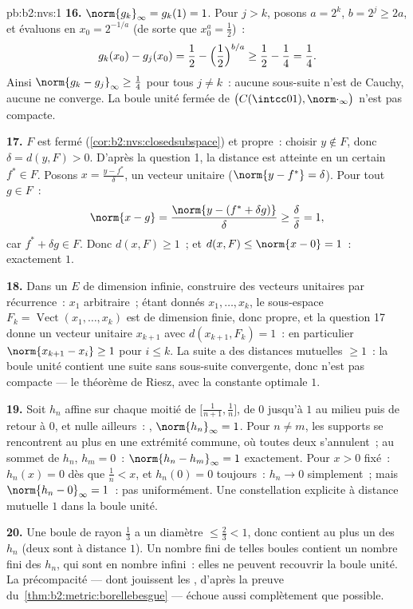 \begin{solution}{pb:b2:nvs:1}
\textbf{16.} $\norm{g_k}_\infty = g_k(1) = 1$. Pour $j > k$, posons
$a = 2^k$, $b = 2^j \geq 2a$, et évaluons en $x_0 = 2^{-1/a}$
(de sorte que $x_0^a = \frac12$)~:
\[
g_k(x_0) - g_j(x_0) = \frac12 - \Bigl(\frac12\Bigr)^{b/a}
\geq \frac12 - \frac14 = \frac14 .
\]
Ainsi $\norm{g_k - g_j}_\infty \geq \frac14$ pour tous $j \neq k$~: aucune
sous-suite n'est de Cauchy, aucune ne converge. La boule unité fermée de
$\bigl(C(\intcc01), \norm\cdot_\infty\bigr)$ n'est pas compacte.

\textbf{17.} $F$ est fermé (\cref{cor:b2:nvs:closedsubspace})
et propre~: choisir $y \notin F$, donc $\delta = d(y, F) > 0$. D'après la
question 1, la distance est atteinte en un certain $f^* \in F$. Posons $x
= \frac{y - f^*}{\delta}$, un vecteur unitaire ($\norm{y - f^*} =
\delta$). Pour tout $g \in F$~:
\[
\norm{x - g} = \frac{\norm{y - (f^* + \delta g)}}{\delta}
\geq \frac{\delta}{\delta} = 1 ,
\]
car $f^* + \delta g \in F$. Donc $d(x, F) \geq 1$~; et $d(x,
F) \leq \norm{x - 0} = 1$~: exactement $1$.

\textbf{18.} Dans un $E$ de dimension infinie, construire des vecteurs
unitaires par récurrence~: $x_1$ arbitraire~; étant donnés $x_1, \dots, x_k$, le
sous-espace $F_k = \operatorname{Vect}(x_1, \dots, x_k)$ est
de dimension finie, donc propre, et la question 17 donne un vecteur unitaire
$x_{k+1}$ avec $d(x_{k+1}, F_k) = 1$~: en particulier
$\norm{x_{k+1} - x_i} \geq 1$ pour $i \leq k$. La suite a des
distances mutuelles $\geq 1$~: la boule unité contient une suite
sans sous-suite convergente, donc n'est pas compacte ---
le théorème de Riesz, avec la constante optimale $1$.

\textbf{19.} Soit $h_n$ affine sur chaque moitié de
$\bigl[\frac1{n+1}, \frac1n\bigr]$, de $0$ jusqu'à $1$ au
milieu puis de retour à $0$, et nulle ailleurs~: ,
$\norm{h_n}_\infty = 1$. Pour $n \neq m$, les supports se rencontrent au
plus en une extrémité commune, où toutes deux s'annulent~; au sommet de
$h_n$, $h_m = 0$~: $\norm{h_n - h_m}_\infty = 1$ exactement. Pour
$x > 0$ fixé~: $h_n(x) = 0$ dès que $\frac1n < x$, et
$h_n(0) = 0$ toujours~: $h_n \to 0$ simplement~; mais
$\norm{h_n - 0}_\infty = 1$~: pas uniformément. Une constellation
explicite à distance mutuelle $1$ dans la boule unité.

\textbf{20.} Une boule de rayon $\frac13$ a un diamètre $\leq
\frac23 < 1$, donc contient au plus un des $h_n$ (deux sont
à distance $1$). Un nombre fini de telles boules contient un nombre
fini des $h_n$, qui sont en nombre infini~: elles ne peuvent recouvrir
la boule unité. La précompacité --- dont jouissent les , d'après la preuve du~\cref{thm:b2:metric:borellebesgue}
--- échoue aussi complètement que possible.


\end{solution}
